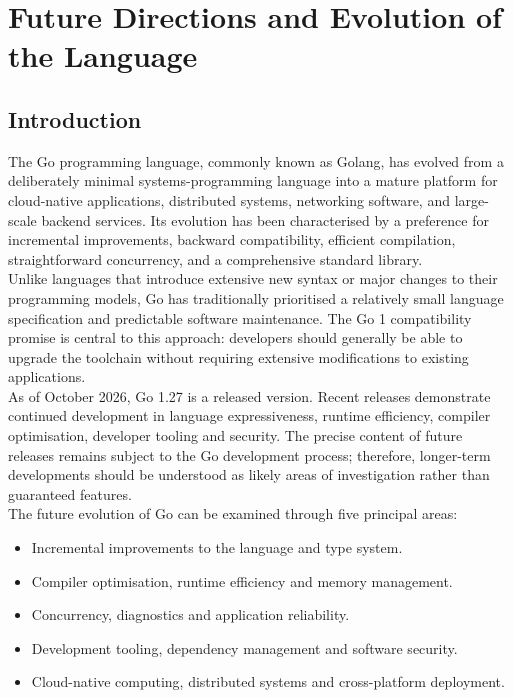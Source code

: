 \section{Future Directions and Evolution of the Language}

\subsection{Introduction}

The Go programming language, commonly known as Golang, has evolved from a deliberately minimal systems-programming language into a mature platform for cloud-native applications, distributed systems, networking software, and large-scale backend services. Its evolution has been characterised by a preference for incremental improvements, backward compatibility, efficient compilation, straightforward concurrency, and a comprehensive standard library.\\

Unlike languages that introduce extensive new syntax or major changes to their programming models, Go has traditionally prioritised a relatively small language specification and predictable software maintenance. The Go 1 compatibility promise is central to this approach: developers should generally be able to upgrade the toolchain without requiring extensive modifications to existing applications.\\

As of October 2026, Go 1.27 is a released version. Recent releases demonstrate continued development in language expressiveness, runtime efficiency, compiler optimisation, developer tooling and security. The precise content of future releases remains subject to the Go development process; therefore, longer-term developments should be understood as likely areas of investigation rather than guaranteed features.\\

The future evolution of Go can be examined through five principal areas:

\begin{itemize}
    \item Incremental improvements to the language and type system.
    \item Compiler optimisation, runtime efficiency and memory management.
    \item Concurrency, diagnostics and application reliability.
    \item Development tooling, dependency management and software security.
    \item Cloud-native computing, distributed systems and cross-platform deployment.
\end{itemize}

